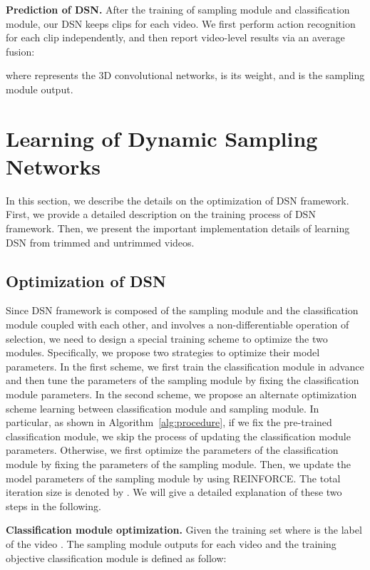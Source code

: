 \documentclass[journal]{IEEEtran}
\begin{document}
{\bf Prediction of DSN.} After the training of sampling module and classification module, our DSN keeps  clips for each video. We first perform action recognition for each clip independently, and then report video-level results via an average fusion:

where  represents the 3D convolutional networks,  is its weight, and  is the sampling module output.

\section{Learning of Dynamic Sampling Networks}
\label{sec:optimization}
In this section, we describe the details on the optimization of DSN framework.
First, we provide a detailed description on the training process of DSN framework.
Then, we present the important implementation details of learning DSN from trimmed and untrimmed videos.

\subsection{Optimization of DSN}

Since DSN framework is composed of the sampling module and the classification module coupled with each other, and involves a non-differentiable operation of selection, we need to design a special training scheme to optimize the two modules.
Specifically, we propose two strategies to optimize their model parameters. In the first scheme, we first train the classification module in advance and then tune the parameters of the sampling module by fixing the classification module parameters.
In the second scheme, we propose an alternate optimization scheme learning between classification module and sampling module.
In particular, as shown in Algorithm~\ref{alg:procedure}, if we fix the pre-trained classification module, we skip the process of updating the classification module parameters.
Otherwise, we first optimize the parameters  of the classification module by fixing the parameters of the sampling module.
Then, we update the model parameters  of the sampling module by using REINFORCE. The total iteration size is denoted by .
We will give a detailed explanation of these two steps in the following.

{\bf Classification module optimization.} Given the training set  where  is the label of the video .
The sampling module outputs  for each video  and the training objective classification module is defined as follow:
\end{document}
